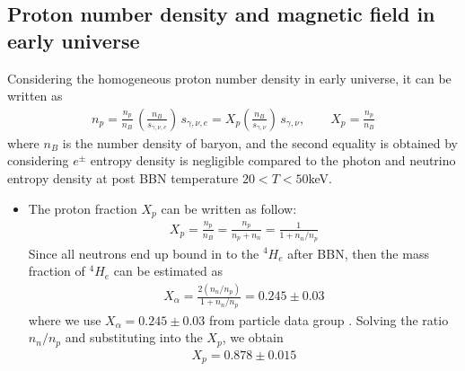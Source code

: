 \documentclass[Universe,article,submit,moreauthors,pdftex]{Definitions/mdpi}
\begin{document}
\subsection{Proton number density and magnetic field in early universe}
Considering the homogeneous proton number density in early universe, it can be written as
\begin{align}\label{density_proton}
n_p=\frac{n_p}{n_B}\,\left(\frac{n_B}{s_{\gamma,\nu,e}}\right)\,s_{\gamma,\nu,e}= X_p\left(\frac{n_B}{s_{\gamma,\nu}}\right)\,s_{\gamma,\nu},\qquad X_p=\frac{n_p}{n_B}
\end{align}
where $n_B$ is the number density of baryon, and the second equality is obtained by considering $e^\pm$ entropy density is negligible compared to the photon and neutrino entropy density at post BBN temperature $20<T<50$keV. 
\begin{itemize}

  \item The proton fraction $X_p$ can be written as follow:
  \begin{align}
  X_p=\frac{n_p}{n_B}=\frac{n_p}{n_p+n_n}=\frac{1}{1+n_n/n_p}
  \end{align}
Since all neutrons end up bound in to the $^4H_e$ after BBN, then the mass fraction of $^4H_e$ can be estimated as 
\begin{align}
X_\alpha=\frac{2(n_n/n_p)}{1+n_n/n_p}=0.245\pm0.03
\end{align} 
where we use $X_\alpha=0.245\pm0.03$ from particle data group \cite{ParticleDataGroup:2022pth}. Solving the ratio $n_n/n_p$ and substituting into the $X_p$, we obtain
\begin{align}
X_p=0.878\pm0.015
\end{align}


\end{itemize}
\end{document}
